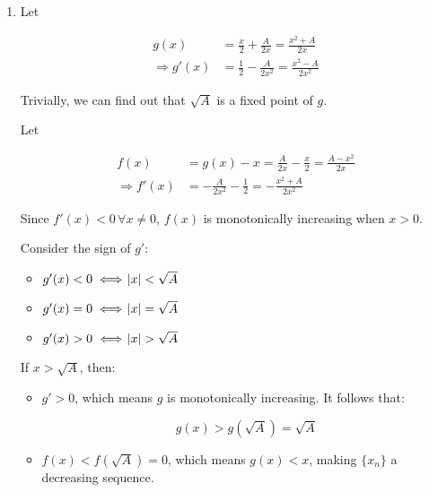 \documentclass[../../../../Assignments]{subfiles}
\begin{document}
\begin{solution}
    \begin{enumerate}[label = \alph*)]
        \item Let

            \begin{align*}
                             g(x) &= \frac{x}{2} + \frac{A}{2x} = \frac{x^2 + A}{2x}\\
                \Rightarrow g'(x) &= \frac{1}{2} - \frac{A}{2x^2} = \frac{x^2 - A}{2x^2}
            \end{align*}

            Trivially, we can find out that \(\sqrt{A}\) is a fixed point of
            \(g\).

            Let

            \begin{align*}
                             f(x) &= g(x) - x = \frac{A}{2x} - \frac{x}{2} = \frac{A - x^2}{2x} \\
                \Rightarrow f'(x) &= - \frac{A}{2x^2} - \frac{1}{2} = - \frac{x^2 + A}{2x^2}
            \end{align*}

            Since \(f'(x) < 0 \, \forall x \neq 0\), \(f(x)\) is monotonically
            increasing when \(x > 0\).

            Consider the sign of \(g'\):

            \begin{itemize}
                \item \(g'(x) < 0 \iff \abs{x} < \sqrt{A}\)
                \item \(g'(x) = 0 \iff \abs{x} = \sqrt{A}\)
                \item \(g'(x) > 0 \iff \abs{x} > \sqrt{A}\)
            \end{itemize}

            If \(x > \sqrt{A}\), then:

            \begin{itemize}
                \item \(g' > 0\), which means \(g\) is monotonically increasing.
                    It follows that:

                    \[g(x) > g(\sqrt{A}) = \sqrt{A}\]

                \item \(f(x) < f(\sqrt{A}) = 0\), which means \(g(x) < x\),
                    making \(\{x_n\}\) a decreasing sequence.
            \end{itemize}


\end{enumerate}
\end{solution}
\end{document}
